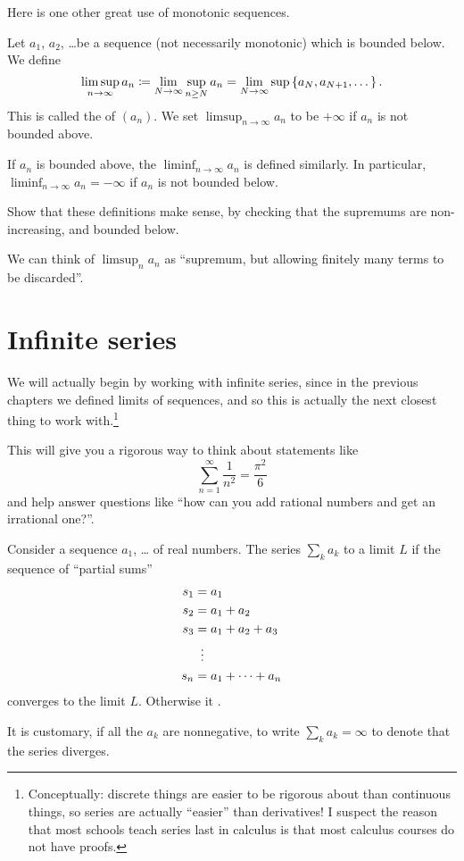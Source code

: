 Here is one other great use of monotonic sequences.
\begin{definition}
	Let $a_1$, $a_2$, \dots be a sequence
	(not necessarily monotonic) which is bounded below.
	We define
	\[
		\limsup_{n \to \infty} a_n
		\coloneqq \lim_{N \to \infty} \sup_{n \ge N} a_n
		= \lim_{N \to \infty} \sup \left\{ a_N, a_{N+1}, \dots \right\}.
	\]
	This is called the  of $(a_n)$.
	We set $\limsup_{n \to \infty} a_n$ to be $+\infty$
	if $a_n$ is not bounded above.

	If $a_n$ is bounded above,
	the  $\liminf_{n \to \infty} a_n$
	is defined similarly.
	In particular, $\liminf_{n \to \infty} a_n = -\infty$
	if $a_n$ is not bounded below.
\end{definition}
\begin{exercise}
	Show that these definitions make sense,
	by checking that the supremums are non-increasing,
	and bounded below.
\end{exercise}
We can think of $\limsup_n a_n$ as
``supremum, but allowing finitely many terms to be discarded''.


\section{Infinite series}

We will actually begin by working with infinite series,
since in the previous chapters we defined limits of sequences,
and so this is actually the next closest thing to work
with.\footnote{Conceptually: discrete things are easier
	to be rigorous about than continuous things,
	so series are actually ``easier'' than derivatives!
	I suspect the reason that most schools teach series last in calculus
	is that most calculus courses do not have proofs.}

This will give you a rigorous way to think about
statements like
\[ \sum_{n = 1}^{\infty} \frac{1}{n^2} = \frac{\pi^2}{6} \]
and help answer questions like
``how can you add rational numbers and get an irrational one?''.

\begin{definition}
	Consider a sequence $a_1$, \dots{} of real numbers.
	The series $\sum_k a_k$  to a limit $L$ if
	the sequence of ``partial sums''
	\begin{align*}
		s_1 &= a_1 \\
		s_2 &= a_1 + a_2 \\
		s_3 &= a_1 + a_2 + a_3 \\
		&\vdotswithin= \\
		s_n &= a_1 + \dots + a_n
	\end{align*}
	converges to the limit $L$.
	Otherwise it .
\end{definition}
\begin{abuse}
	It is customary, if all the $a_k$ are nonnegative,
	to write $\sum_k a_k = \infty$ to denote that the series diverges.
\end{abuse}

